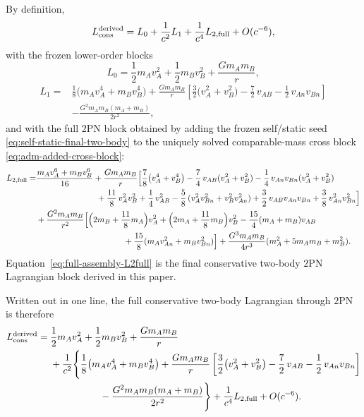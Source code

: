 \documentclass[11pt]{article}
\newcommand{\TwoPN}{\mathrm{2PN}}
\begin{document}
By definition,
\begin{equation}
L_{\rm cons}^{\rm derived}
=
L_0+\frac{1}{c^2}L_1+\frac{1}{c^4}L_{2,\mathrm{full}}+O(c^{-6}),
\label{eq:full-assembly-Lcons}
\end{equation}
with the frozen lower-order blocks
\begin{equation}
L_0=
\frac12 m_A v_A^2
+\frac12 m_B v_B^2
+\frac{Gm_A m_B}{r},
\label{eq:full-assembly-L0}
\end{equation}
\begin{align}
L_1={}&
\frac18\bigl(m_A v_A^4+m_B v_B^4\bigr)
+\frac{Gm_A m_B}{r}
\left[
\frac32\bigl(v_A^2+v_B^2\bigr)
-\frac72\,v_{AB}
-\frac12\,v_{An}v_{Bn}
\right]
\nonumber\\
&
-\frac{G^2m_A m_B(m_A+m_B)}{2r^2},
\label{eq:full-assembly-L1}
\end{align}
and with the full \(\TwoPN\) block obtained by adding the frozen self/static seed
\cref{eq:self-static-final-two-body} to the uniquely solved comparable-mass cross block
\cref{eq:adm-added-cross-block}:
\begin{align}
L_{2,\mathrm{full}}=
&\frac{m_A v_A^6+m_B v_B^6}{16}
+\frac{Gm_A m_B}{r}
\Big[
\frac78\bigl(v_A^4+v_B^4\bigr)
-\frac74\,v_{AB}(v_A^2+v_B^2)
-\frac14\,v_{An}v_{Bn}(v_A^2+v_B^2)
\nonumber\\
&\hspace{7.25em}
+\frac{11}{8}\,v_A^2v_B^2
+\frac14\,v_{AB}^2
-\frac58\,(v_A^2v_{Bn}^2+v_B^2v_{An}^2)
+\frac32\,v_{AB}v_{An}v_{Bn}
+\frac38\,v_{An}^2v_{Bn}^2
\Big]
\nonumber\\
&+\frac{G^2m_A m_B}{r^2}
\Big[
\Bigl(2m_B+\frac{11}{8}m_A\Bigr)v_A^2
+\Bigl(2m_A+\frac{11}{8}m_B\Bigr)v_B^2
-\frac{15}{4}(m_A+m_B)v_{AB}
\nonumber\\
&\hspace{10.5em}
+\frac{15}{8}(m_A v_{An}^2+m_B v_{Bn}^2)
\Big]
+\frac{G^3m_A m_B}{4r^3}(m_A^2+5m_A m_B+m_B^2).
\label{eq:full-assembly-L2full}
\end{align}
Equation~\eqref{eq:full-assembly-L2full} is the final conservative two-body
\(\TwoPN\) Lagrangian block derived in this paper.

Written out in one line, the full conservative two-body Lagrangian through \(\TwoPN\) is
therefore
\begin{align}
L_{\rm cons}^{\rm derived}
={}&
\frac12 m_A v_A^2+\frac12 m_B v_B^2
+\frac{Gm_A m_B}{r}
\nonumber\\
&+\frac{1}{c^2}
\Bigg\{
\frac18\bigl(m_A v_A^4+m_B v_B^4\bigr)
+\frac{Gm_A m_B}{r}
\left[
\frac32\bigl(v_A^2+v_B^2\bigr)
-\frac72\,v_{AB}
-\frac12\,v_{An}v_{Bn}
\right]
\nonumber\\
&\hspace{5.2em}
-\frac{G^2m_A m_B(m_A+m_B)}{2r^2}
\Bigg\}
+\frac{1}{c^4}L_{2,\mathrm{full}}
+O(c^{-6}).
\label{eq:full-assembly-Lcons-expanded}
\end{align}
\end{document}
